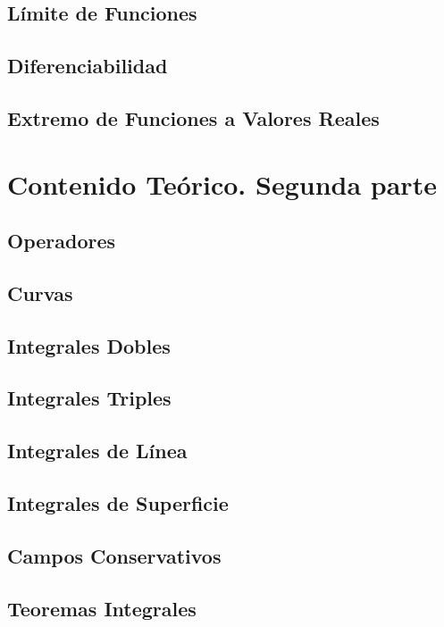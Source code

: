 \documentclass[10pt, a4paper]{report}
\begin{document}
        \section{L\'imite de Funciones}
            
        \section{Diferenciabilidad}
            
        \section{Extremo de Funciones a Valores Reales} 
            

    \chapter{Contenido Teórico. Segunda parte}
        \section{Operadores}
            
        \section{Curvas}
            
        \section{Integrales Dobles} 
            
        \section{Integrales Triples}
            
        \section{Integrales de L\'inea}
            
        \section{Integrales de Superficie}
        \section{Campos Conservativos}
            
        \section{Teoremas Integrales}
            
\end{document}
